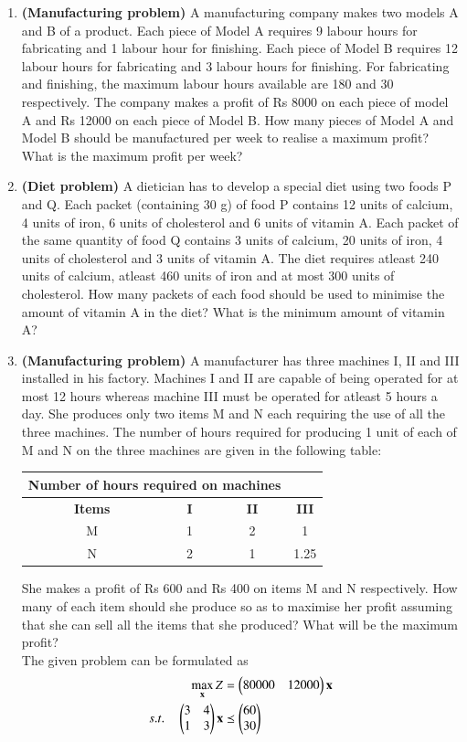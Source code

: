 \begin{enumerate}[label=\arabic*.,ref=\thesection.\theenumi]
\item  \textbf{(Manufacturing problem)} A manufacturing company makes two models
A and B of a product. Each piece of Model A requires 9 labour hours for fabricating
and 1 labour hour for finishing. Each piece of Model B requires 12 labour hours for
fabricating and 3 labour hours for finishing. For fabricating and finishing, the maximum
labour hours available are 180 and 30 respectively. The company makes a profit of
Rs 8000 on each piece of model A and Rs 12000 on each piece of Model B. How many
pieces of Model A and Model B should be manufactured per week to realise a maximum
profit? What is the maximum profit per week?\\
\item \textbf {(Diet problem)} A dietician has to develop a special diet using two foods
P and Q. Each packet (containing 30 g) of food P contains 12 units of calcium, 4 units
of iron, 6 units of cholesterol and 6 units of vitamin A. Each packet of the same quantity
of food Q contains 3 units of calcium, 20 units of iron, 4 units of cholesterol and 3 units
of vitamin A. The diet requires atleast 240 units of calcium, atleast 460 units of iron and
at most 300 units of cholesterol. How many packets of each food should be used to
minimise the amount of vitamin A in the diet? What is the minimum amount of vitamin A?\\
\item \textbf{(Manufacturing problem)} A manufacturer has three machines I, II
and III installed in his factory. Machines I and II are capable of being operated for
at most 12 hours whereas machine III must be operated for atleast 5 hours a day. She
produces only two items M and N each requiring the use of all the three machines.
The number of hours required for producing 1 unit of each of M and N on the three
machines are given in the following table:\\

\begin{tabular}{|c|c|c|c|}
\hline
 \multicolumn{3}{|l}{\textbf{ Number of hours required on machines}}& \\ \cline{2-4}
\hline
\textbf {Items}&\textbf{I}&\textbf{II}&\textbf{III}\\
\hline
M&1&2&1\\
\hline
 N&2&1&1.25\\
 \hline 

\end{tabular}

She makes a profit of Rs 600 and Rs 400 on items M and N respectively. How many
of each item should she produce so as to maximise her profit assuming that she can sell
all the items that she produced? What will be the maximum profit?
\\
\solution The given problem can be formulated as
\begin{align}
\max_{\mathbf{x}} Z &= \begin{pmatrix}80000&12000\end{pmatrix}\mathbf{x}
\\
s.t. \quad 
\begin{pmatrix}
3 & 4
\\
1 & 3
\end{pmatrix}
\mathbf{x} & \preceq \begin{pmatrix}60\\30\end{pmatrix}
\label{eq:manufacturing}
\end{align}


\end{enumerate}
